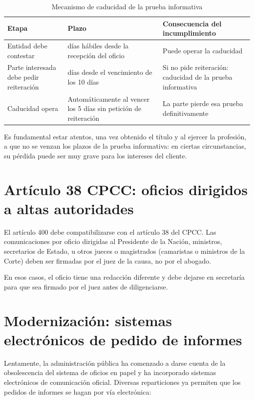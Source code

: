 \documentclass[12pt,oneside]{book}
\begin{document}
\begin{table}[H]
\centering
\caption{Mecanismo de caducidad de la prueba informativa}
\begin{tabularx}{\textwidth}{>{\raggedright\arraybackslash}p{} >{\raggedright\arraybackslash}p{} >{\raggedright\arraybackslash}X}
\toprule
\textbf{Etapa} & \textbf{Plazo} & \textbf{Consecuencia del incumplimiento} \\
\midrule
Entidad debe contestar & 10 días hábiles desde la recepción del oficio & Puede operar la caducidad \\
Parte interesada debe pedir reiteración & 5 días desde el vencimiento de los 10 días & Si no pide reiteración: caducidad de la prueba informativa \\
Caducidad opera & Automáticamente al vencer los 5 días sin petición de reiteración & La parte pierde esa prueba definitivamente \\
\bottomrule
\end{tabularx}
\end{table}

\begin{important}
Es fundamental estar atentos, una vez obtenido el título y al ejercer la profesión, a que no se venzan los plazos de la prueba informativa: en ciertas circunstancias, su pérdida puede ser muy grave para los intereses del cliente.
\end{important}

\section{Artículo 38 CPCC: oficios dirigidos a altas autoridades}

El artículo 400 debe compatibilizarse con el artículo 38 del CPCC. Las comunicaciones por oficio dirigidas al Presidente de la Nación, ministros, secretarios de Estado, u otros jueces o magistrados (camaristas o ministros de la Corte) deben ser firmadas por el juez de la causa, no por el abogado.

En esos casos, el oficio tiene una redacción diferente y debe dejarse en secretaría para que sea firmado por el juez antes de diligenciarse.

\section{Modernización: sistemas electrónicos de pedido de informes}

Lentamente, la administración pública ha comenzado a darse cuenta de la obsolescencia del sistema de oficios en papel y ha incorporado sistemas electrónicos de comunicación oficial. Diversas reparticiones ya permiten que los pedidos de informes se hagan por vía electrónica:
\end{document}
